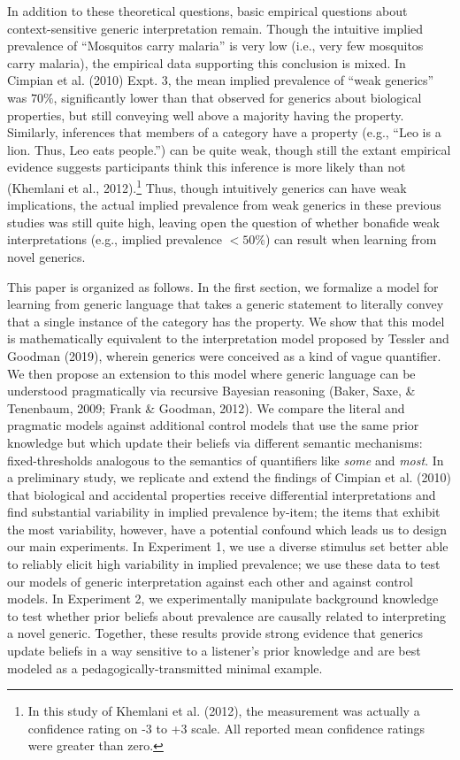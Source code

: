\documentclass[floatsintext,doc]{apa6}
\let\rmarkdownfootnote\footnote%
\def\footnote{\protect\rmarkdownfootnote}
\begin{document}
In addition to these theoretical questions, basic empirical questions about context-sensitive generic interpretation remain.
Though the intuitive implied prevalence of \enquote{Mosquitos carry malaria} is very low (i.e., very few mosquitos carry malaria), the empirical data supporting this conclusion is mixed.
In Cimpian et al. (2010) Expt. 3, the mean implied prevalence of \enquote{weak generics} was \(70\%\), significantly lower than that observed for generics about biological properties, but still conveying well above a majority having the property.
Similarly, inferences that members of a category have a property (e.g., \enquote{Leo is a lion. Thus, Leo eats people.}) can be quite weak, though still the extant empirical evidence suggests participants think this inference is more likely than not (Khemlani et al., 2012).\footnote{In this study of Khemlani et al. (2012), the measurement was actually a confidence rating on -3 to +3 scale. All reported mean confidence ratings were greater than zero. }
Thus, though intuitively generics can have weak implications, the actual implied prevalence from weak generics in these previous studies was still quite high, leaving open the question of whether bonafide weak interpretations (e.g., implied prevalence \(<50\%\)) can result when learning from novel generics.

This paper is organized as follows.
In the first section, we formalize a model for learning from generic language that takes a generic statement to literally convey that a single instance of the category has the property.
We show that this model is mathematically equivalent to the interpretation model proposed by Tessler and Goodman (2019), wherein generics were conceived as a kind of vague quantifier.
We then propose an extension to this model where generic language can be understood pragmatically via recursive Bayesian reasoning (Baker, Saxe, \& Tenenbaum, 2009; Frank \& Goodman, 2012).
We compare the literal and pragmatic models against additional control models that use the same prior knowledge but which update their beliefs via different semantic mechanisms: fixed-thresholds analogous to the semantics of quantifiers like \emph{some} and \emph{most}.
In a preliminary study, we replicate and extend the findings of Cimpian et al. (2010) that biological and accidental properties receive differential interpretations and find substantial variability in implied prevalence by-item; the items that exhibit the most variability, however, have a potential confound which leads us to design our main experiments.
In Experiment 1, we use a diverse stimulus set better able to reliably elicit high variability in implied prevalence; we use these data to test our models of generic interpretation against each other and against control models.
In Experiment 2, we experimentally manipulate background knowledge to test whether prior beliefs about prevalence are causally related to interpreting a novel generic.
Together, these results provide strong evidence that generics update beliefs in a way sensitive to a listener's prior knowledge and are best modeled as a pedagogically-transmitted minimal example.
\end{document}

